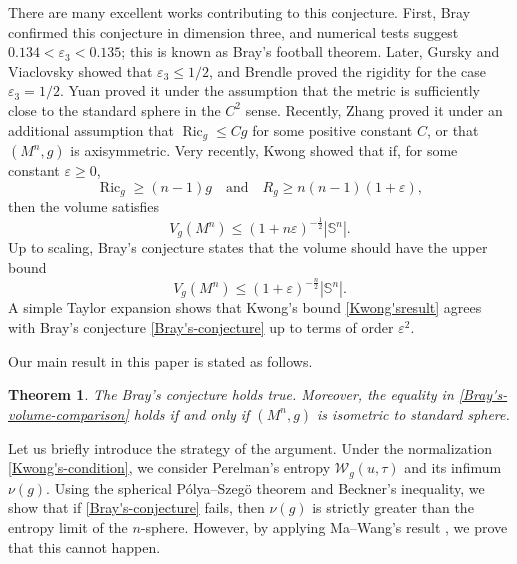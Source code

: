 \documentclass[11pt, reqno]{amsart}
\numberwithin{equation}{section}
\newtheorem{theorem}{Theorem}[section]
\theoremstyle{remark}
\newcommand{\W}{\mathcal{W}}
\begin{document}
There are many excellent works contributing to this conjecture. First, Bray \cite{Bray} confirmed this conjecture in dimension three, and numerical tests suggest $0.134 < \varepsilon_3 < 0.135$; this is known as Bray's football theorem. Later, Gursky and Viaclovsky \cite{Gursky-Via} showed that $\varepsilon_3 \leq 1/2$, and Brendle \cite{Brendle} proved the rigidity for the case $\varepsilon_3 = 1/2$. Yuan \cite{Yuan} proved it under the assumption that the metric is sufficiently close to the standard sphere in the $C^2$ sense. Recently, Zhang \cite{Zhang} proved it under an additional assumption that $\operatorname{Ric}_g \leq C g$ for some positive constant $C$, or that $(M^n,g)$ is axisymmetric. Very recently, Kwong \cite{Kwong} showed that if, for some constant $\varepsilon \geq 0$,
\begin{equation}\label{Kwong's-condition}
    \operatorname{Ric}_g \geq (n-1)g \quad \text{and} \quad R_g \geq n(n-1)(1+\varepsilon),
\end{equation}
then the volume satisfies 
\begin{equation}\label{Kwong'sresult}
   V_g(M^n) \leq (1 + n \varepsilon)^{-\frac{1}{2}} |\mathbb{S}^n|.
\end{equation}
Up to scaling, Bray's conjecture states that the volume should have the upper bound
\begin{equation}\label{Bray's-conjecture}
     V_g(M^n) \leq (1 + \varepsilon)^{-\frac{n}{2}} |\mathbb{S}^n|.
\end{equation}
A simple Taylor expansion shows that Kwong's bound \eqref{Kwong'sresult} agrees with Bray's conjecture \eqref{Bray's-conjecture} up to terms of order $\varepsilon^2$.




Our main result in this paper is stated as follows.
\begin{theorem}\label{thm:main-theorem}
   The  Bray's conjecture holds true. {Moreover, the equality in \eqref{Bray's-volume-comparison} holds if and only if $(M^n, g)$  is isometric to standard sphere.}
\end{theorem}



Let us briefly introduce the strategy of the argument. Under the normalization \eqref{Kwong's-condition}, we consider Perelman's entropy $\W_g(u,\tau)$ and its infimum $\nu(g)$. Using the spherical P\'olya–Szeg\"o theorem and Beckner's inequality, we show that if \eqref{Bray's-conjecture} fails, then $\nu(g)$ is strictly greater than the entropy limit of the $n$-sphere. However, by applying Ma–Wang's result \cite{MaWang}, we prove that this cannot happen. 
\end{document}
